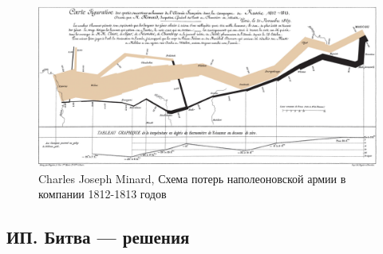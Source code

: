 \documentclass[12pt, a4paper]{article}
\begin{document}
\begin{figure}[h!]
\includegraphics[width=19cm]{figures/Minard.png}
\caption*{Charles Joseph Minard, Схема потерь наполеоновской армии в компании 1812-1813 годов}
\end{figure}



\subsection{ИП. Битва — решения}
\end{document}
